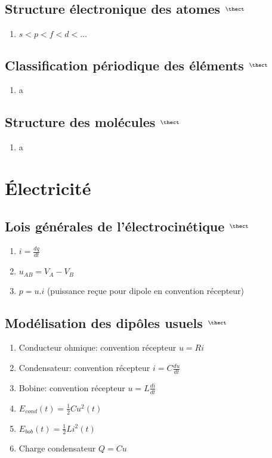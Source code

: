 \documentclass[fleqn]{article}
\theoremstyle{definition} \newtheorem*{defi}{D\'efinition}
\theoremstyle{definition} \newtheorem*{theo}{Th\'eor\`eme}
\theoremstyle{definition} \newtheorem*{coro}{Corollaire}
\theoremstyle{remark} \newtheorem*{rqs}{Remarques}
\theoremstyle{definition} \newtheorem*{prop}{Propri\'et\'e}
\begin{document}
\subsection{Structure \'electronique des atomes $^{\thect}$}
\begin{enumerate}
	\item $s < p < f < d < \hdots $
\end{enumerate}

\subsection{Classification p\'eriodique des \'el\'ements $^{\thect}$}
\begin{enumerate}
	\item a
\end{enumerate}

\subsection{Structure des mol\'ecules $^{\thect}$}
\begin{enumerate}
	\item a
\end{enumerate}


\section{\'Electricit\'e}
\subsection{Lois g\'en\'erales de l'\'electrocin\'etique $^{\thect}$}
\begin{enumerate}
	\item $i = \frac{dq}{dt}$
	\item $u_{AB} = V_A - V_B$
	\item $p = u.i$ (puissance re\c{c}ue pour dipole en convention r\'ecepteur)
\end{enumerate}

\subsection{Mod\'elisation des dip\^oles usuels $^{\thect}$}
\begin{enumerate}
	\item Conducteur ohmique: convention r\'ecepteur $u = Ri$
	\item Condensateur: convention r\'ecepteur $i = C\frac{du}{dt}$
	\item Bobine: convention r\'ecepteur $u = L\frac{di}{dt}$
	\item $E_{cond}(t) = \frac{1}{2} Cu^2(t)$
	\item $E_{bob}(t) = \frac{1}{2} Li^2(t)$
	\item Charge condensateur $Q = Cu$
\end{enumerate}
\end{document}
